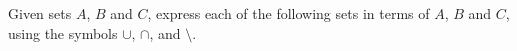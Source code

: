 \documentclass[../main.tex]{subfiles}
\begin{document}
\problem{}

Given sets \(A\), \(B\) and \(C\), express each of the following sets in terms
of \(A\), \(B\) and \(C\), using the symbols \(\cup\), \(\cap\), and
\(\setminus\).




\end{document}
